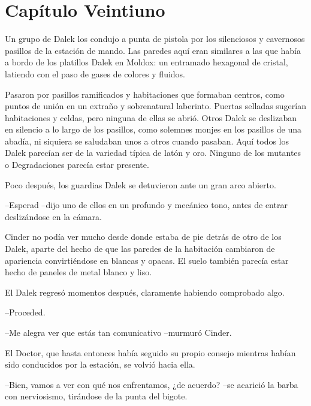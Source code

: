 \chapter*{Capítulo Veintiuno}




Un grupo de Dalek los condujo a punta de pistola por los silenciosos y cavernosos pasillos de la estación de mando. Las paredes aquí eran similares a las que había a bordo de los platillos Dalek en Moldox: un entramado hexagonal de cristal, latiendo con el paso de gases de colores y fluidos.

Pasaron por pasillos ramificados y habitaciones que formaban centros, como puntos de unión en un extraño y sobrenatural laberinto. Puertas selladas sugerían habitaciones y celdas, pero ninguna de ellas se abrió. Otros Dalek se deslizaban en silencio a lo largo de los pasillos, como solemnes monjes en los pasillos de una abadía, ni siquiera se saludaban unos a otros cuando pasaban. Aquí todos los Dalek parecían ser de la variedad típica de latón y oro. Ninguno de los mutantes o Degradaciones parecía estar presente.

Poco después, los guardias Dalek se detuvieron ante un gran arco abierto.



--Esperad --dijo uno de ellos en un profundo y mecánico tono, antes de entrar deslizándose en la cámara.



Cinder no podía ver mucho desde donde estaba de pie detrás de otro de los Dalek, aparte del hecho de que las paredes de la habitación cambiaron de apariencia convirtiéndose en blancas y opacas. El suelo también parecía estar hecho de paneles de metal blanco y liso.

El Dalek regresó momentos después, claramente habiendo comprobado algo. 



--Proceded.

--Me alegra ver que estás tan comunicativo --murmuró Cinder.



El Doctor, que hasta entonces había seguido su propio consejo mientras habían sido conducidos por la estación, se volvió hacia ella. 



--Bien, vamos a ver con qué nos enfrentamos, ¿de acuerdo? --se acarició la barba con nerviosismo, tirándose de la punta del bigote.



